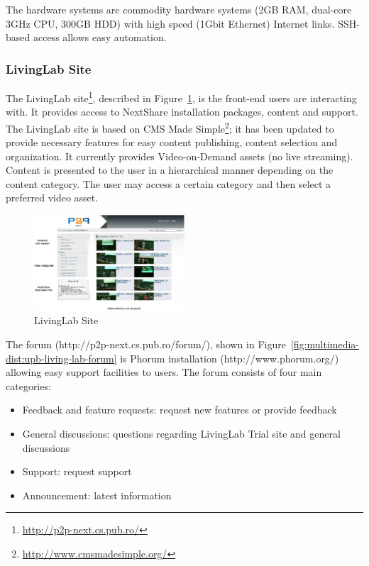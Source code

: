 The hardware systems are commodity hardware systems (2GB RAM, dual-core 3GHz
CPU, 300GB HDD) with high speed (1Gbit Ethernet) Internet links. SSH-based
access allows easy automation.

\subsubsection{LivingLab Site}

The LivingLab site\footnote{\url{http://p2p-next.cs.pub.ro/}}, described in
Figure~\ref{fig:multimedia-dist:upb-living-lab-site}, is
the front-end users are interacting with. It provides access to NextShare
installation packages, content and support. The LivingLab site is based on
CMS Made Simple\footnote{\url{http://www.cmsmadesimple.org/}}; it has been updated to
provide necessary features for easy content publishing, content selection and
organization. It currently provides Video-on-Demand assets (no live
streaming). Content is presented to the user in a hierarchical manner
depending on the content category. The user may access a certain
category and then select a preferred video asset.

\begin{figure}
  \centering
  \includegraphics[width=0.5\textwidth]{src/img/multimedia-dist/upb-living-lab-site}
  \caption{LivingLab Site}
  \label{fig:multimedia-dist:upb-living-lab-site}
\end{figure}

The forum (http://p2p-next.cs.pub.ro/forum/), shown in
Figure~\ref{fig:multimedia-dist:upb-living-lab-forum} is Phorum installation (http://www.phorum.org/) allowing easy support facilities to users. The forum consists of four main categories:
\begin{itemize}
  \item Feedback and feature requests: request new features or provide
  feedback
  \item General discussions: questions regarding LivingLab Trial site and general discussions
  \item Support: request support
  \item Announcement: latest information
\end{itemize}

